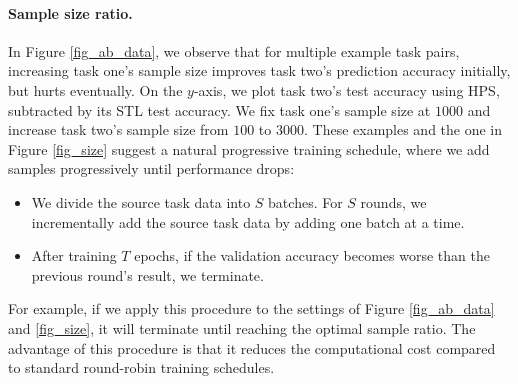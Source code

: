 \paragraph{Sample size ratio.}
In Figure \ref{fig_ab_data}, we observe that for multiple example task pairs, increasing task one's sample size improves task two's prediction accuracy initially, but hurts eventually.
On the $y$-axis, we plot task two's test accuracy using HPS, subtracted by its STL test accuracy.
We fix task one's sample size at $1000$ and increase task two's sample size from $100$ to $3000$.
These examples and the one in Figure \ref{fig_size} suggest a natural progressive training schedule, where we add samples progressively until performance drops:
\begin{itemize}
	\item We divide the source task data into $S$ batches.
	For $S$ rounds, we incrementally add the source task data by adding one batch at a time.
	\item After training $T$ epochs, if the validation accuracy becomes worse than the previous round's result, we terminate.
\end{itemize}
For example, if we apply this procedure to the settings of Figure \ref{fig_ab_data} and \ref{fig_size}, it will terminate until reaching the optimal sample ratio.
The advantage of this procedure is that it reduces the computational cost compared to standard round-robin training schedules.


